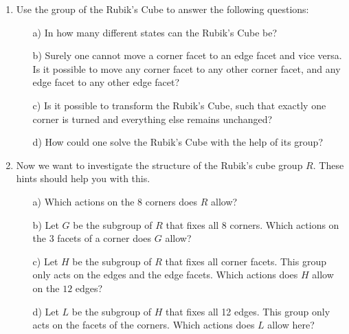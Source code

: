 \documentclass[12pt]{article}
\begin{document}
\begin{enumerate}
\item
Use the group of the Rubik's Cube to answer the following questions:
\begin{itemize}
\item[a)]
In how many different states can the Rubik's Cube be?
\item[b)]
Surely one cannot move a corner facet to an edge facet and vice versa. 
Is it possible to move any corner facet to any other corner facet,
and any edge facet to any other edge facet?
\item[c)]
Is it possible to transform the Rubik's Cube, such that exactly one corner
is turned and everything else remains unchanged?
\item[d)]
How could one solve the Rubik's Cube with the help of its group?
\end{itemize}
\item 
Now we want to investigate the structure of the Rubik's cube group $R$.
These hints should help you with this.
\begin{itemize}
\item[a)]
Which actions on the 8 corners does $R$ allow?
\item[b)]
Let $G$ be the subgroup of $R$ that fixes all $8$ corners. Which actions on
the $3$ facets of a corner does $G$ allow?
\item[c)]
Let $H$ be the subgroup of $R$ that fixes all corner facets.
This group only acts on the edges and the edge facets. Which actions does
$H$ allow on the $12$ edges?
\item[d)]
Let $L$ be the subgroup of $H$ that fixes all 12 edges. This group only
acts on the facets of the corners. Which actions does $L$ allow here?
\end{itemize}
\end{enumerate}
\end{document}
